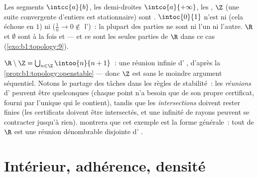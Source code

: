 \begin{example}\label{ex:b1:topology:closed}
Les segments $\intcc{a}{b}$, les demi-droites $\intco{a}{+\infty}$,
les , $\Z$ (une suite convergente d'entiers est
stationnaire) sont . $\intoc{0}{1}$ n'est ni  (cela
échoue en $1$) ni  ($\frac 1n \to 0 \notin$ l')~: la
plupart des parties ne sont ni l'un ni l'autre. $\R$ et $\emptyset$
sont à la fois  et  --- et ce sont les seules parties de
$\R$ dans ce cas (\cref{exo:b1:topology:9}).
\end{example}

\begin{example}\label{ex:b1:topology:rminusz}
$\R \setminus \Z = \bigcup_{n \in \Z} \intoo{n}{n+1}$~: une
réunion infinie d' ,  d'après
la \cref{prop:b1:topology:openstable} --- donc $\Z$ est  sans le
moindre argument séquentiel. Notons le partage des tâches dans
les règles de stabilité~: les \emph{réunions} d' peuvent
être quelconques (chaque point n'a besoin que de son propre
certificat, fourni par l'unique  qui le contient), tandis
que les \emph{intersections} doivent rester finies (les
certificats doivent être intersectés, et une infinité de rayons
peuvent se contracter jusqu'à rien). 
montrera que cet exemple est la forme générale~: tout  de
$\R$ est une réunion dénombrable disjointe d' .
\end{example}

\section{Intérieur, adhérence, densité}

